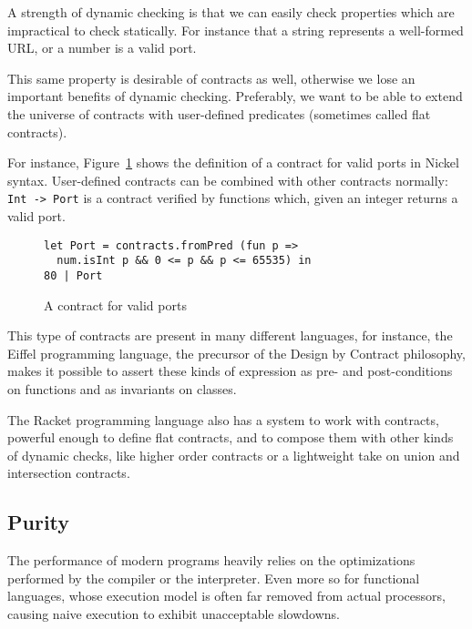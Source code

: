 \documentclass[sigplan,10pt,review,anonymous]{acmart}
\newcommand{\unsure}[2][1=]{}
\newcommand{\nickel}[1]{\lstinline[language=nickel]{#1}}
\begin{document}
A strength of dynamic checking is that we can easily check properties which
are impractical to check statically. For instance that a string
represents a well-formed URL, or a number is a valid port.

This same property is desirable of contracts as well, otherwise we
lose an important benefits of dynamic checking. Preferably, we want to
be able to extend the universe of contracts with user-defined
predicates (sometimes called flat contracts).

For instance, Figure~\ref{fig:port-contract} shows the definition of a
contract for valid ports in Nickel syntax.
%
User-defined contracts can be combined with other contracts normally:
\nickel{Int -> Port} is a contract verified by functions
which, given an integer returns a valid port.


\begin{figure}[h]
  \begin{center}
\begin{lstlisting}[language=nickel]
let Port = contracts.fromPred (fun p =>
  num.isInt p && 0 <= p && p <= 65535) in
80 | Port
\end{lstlisting}
\end{center}
\caption{A contract for valid ports}
\label{fig:port-contract}
\end{figure}

This type of contracts are present in many different languages,
for instance, the Eiffel programming language\cite{meyer1987eiffel}, the precursor
of the Design by Contract philosophy, makes it possible to assert
these kinds of expression as pre- and post-conditions on
functions and as invariants on classes\cite{EiffelDesignByContract}.

The Racket programming language also has a system to work with
contracts, powerful enough to define flat contracts, and
to compose them with other kinds of dynamic checks,
like higher order contracts or a lightweight take on union
and intersection contracts\cite{RacketContracts}.


\subsection{Purity}
\label{sec:optimizations}

\unsure{I (Arnaud) changed the title of this subsection. Maybe it's
  not the best one, but if it is, then we ought to reorder the section
  a little bit to fit the modified narrative.}

The performance of modern programs heavily relies on the optimizations performed
by the compiler or the interpreter. Even more so for functional languages, whose
execution model is often far removed from actual processors, causing naive
execution to exhibit unacceptable slowdowns.
\end{document}

